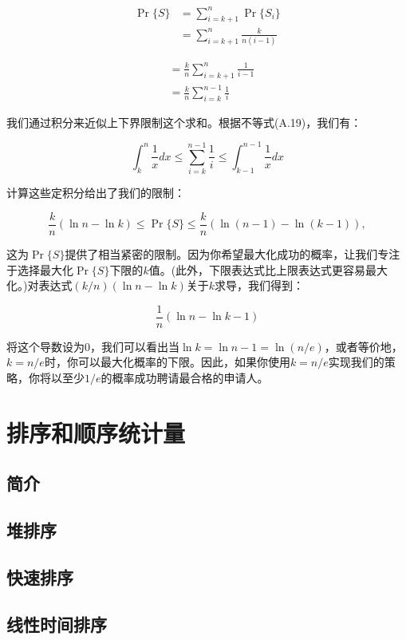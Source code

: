 \documentclass[lang=cn,newtx,10pt,scheme=chinese]{elegantbook}
\begin{document}
$$
\begin{aligned}
\operatorname{Pr}\{S\} & =\sum_{i=k+1}^n \operatorname{Pr}\{S_i\} \\
& =\sum_{i=k+1}^n \frac{k}{n(i-1)}
\end{aligned}
$$

$$
\begin{aligned}
& =\frac{k}{n} \sum_{i=k+1}^n \frac{1}{i-1} \\
& =\frac{k}{n} \sum_{i=k}^{n-1} \frac{1}{i}
\end{aligned}
$$

我们通过积分来近似上下界限制这个求和。根据不等式(A.19)，我们有：

$$
\int_k^n \frac{1}{x} d x \leq \sum_{i=k}^{n-1} \frac{1}{i} \leq \int_{k-1}^{n-1} \frac{1}{x} d x
$$

计算这些定积分给出了我们的限制：

$$
\frac{k}{n}(\ln n-\ln k) \leq \operatorname{Pr}\{S\} \leq \frac{k}{n}(\ln (n-1)-\ln (k-1)),
$$

这为$\operatorname{Pr}\{S\}$提供了相当紧密的限制。因为你希望最大化成功的概率，让我们专注于选择最大化$\operatorname{Pr}\{S\}$下限的$k$值。(此外，下限表达式比上限表达式更容易最大化。)对表达式$(k / n)(\ln n-\ln k)$关于$k$求导，我们得到：

$$
\frac{1}{n}(\ln n-\ln k-1)
$$

将这个导数设为0，我们可以看出当$\ln k=\ln n-1=\ln (n / e)$，或者等价地，$k=n/e$时，你可以最大化概率的下限。因此，如果你使用$k=n/e$实现我们的策略，你将以至少$1/e$的概率成功聘请最合格的申请人。

\part{排序和顺序统计量}

\chapter*{简介}

\chapter{堆排序}\label{chapter-06}

\chapter{快速排序}\label{chapter-07}

\chapter{线性时间排序}\label{chapter-08}
\end{document}

